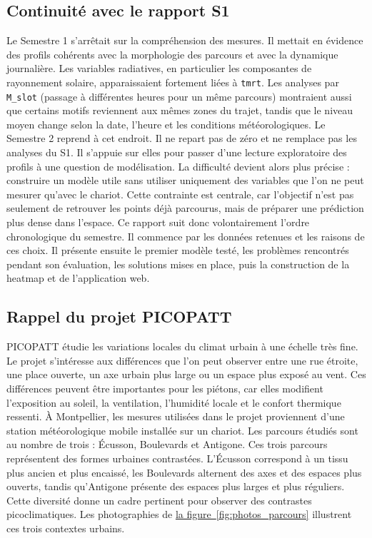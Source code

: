 \documentclass{article}
\begin{document}
\subsection{Continuité avec le rapport S1}

Le Semestre 1 s'arrêtait sur la compréhension des mesures. Il mettait en évidence des profils cohérents avec la morphologie des parcours et avec la dynamique journalière. Les variables radiatives, en particulier les composantes de rayonnement solaire, apparaissaient fortement liées à \texttt{tmrt}. Les analyses par \texttt{M\_slot} (passage à différentes heures pour un même parcours) montraient aussi que certains motifs reviennent aux mêmes zones du trajet, tandis que le niveau moyen change selon la date, l'heure et les conditions météorologiques.
Le Semestre 2 reprend à cet endroit. Il ne repart pas de zéro et ne remplace pas les analyses du S1. Il s'appuie sur elles pour passer d'une lecture exploratoire des profils à une question de modélisation. La difficulté devient alors plus précise : construire un modèle utile sans utiliser uniquement des variables que l'on ne peut mesurer qu'avec le chariot. Cette contrainte est centrale, car l'objectif n'est pas seulement de retrouver les points déjà parcourus, mais de préparer une prédiction plus dense dans l'espace.
Ce rapport suit donc volontairement l'ordre chronologique du semestre. Il commence par les données retenues et les raisons de ces choix. Il présente ensuite le premier modèle testé, les problèmes rencontrés pendant son évaluation, les solutions mises en place, puis la construction de la heatmap et de l'application web.

\subsection{Rappel du projet PICOPATT}

PICOPATT étudie les variations locales du climat urbain à une échelle très fine. Le projet s'intéresse aux différences que l'on peut observer entre une rue étroite, une place ouverte, un axe urbain plus large ou un espace plus exposé au vent. Ces différences peuvent être importantes pour les piétons, car elles modifient l'exposition au soleil, la ventilation, l'humidité locale et le confort thermique ressenti.
À Montpellier, les mesures utilisées dans le projet proviennent d'une station météorologique mobile installée sur un chariot. Les parcours étudiés sont au nombre de trois : Écusson, Boulevards et Antigone. Ces trois parcours représentent des formes urbaines contrastées. L'Écusson correspond à un tissu plus ancien et plus encaissé, les Boulevards alternent des axes et des espaces plus ouverts, tandis qu'Antigone présente des espaces plus larges et plus réguliers. Cette diversité donne un cadre pertinent pour observer des contrastes picoclimatiques.
Les photographies de \hyperref[fig:photos_parcours]{la figure~\ref{fig:photos_parcours}} illustrent ces trois contextes urbains.
\end{document}
